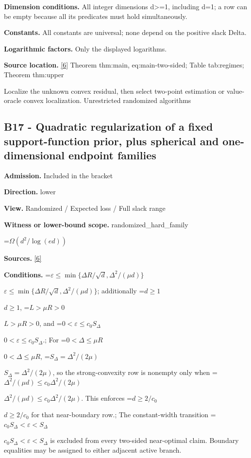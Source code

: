 \documentclass[10pt,a4paper]{article}
\newcommand{\AtlasMath}[1]{\par\begingroup\centering\setbox0=\hbox{$\displaystyle #1$}\ifdim\wd0>1.4\linewidth\typeout{ATLAS WIDE FORMULA: \the\wd0}\fi\ifdim\wd0>\linewidth\resizebox{\linewidth}{!}{\box0}\else\box0\fi\par\endgroup}
\newcommand{\AtlasInlineMath}[1]{\begingroup\setbox0=\hbox{$#1$}\ifdim\wd0>.4\linewidth\endgroup\AtlasMath{#1}\else\endgroup$#1$\fi}
\begin{document}
\textbf{Dimension conditions.} All integer dimensions d>=1, including d=1; a row can be empty because all its predicates must hold simultaneously.



\textbf{Constants.} All constants are universal; none depend on the positive slack Delta.



\textbf{Logarithmic factors.} Only the displayed logarithms.



\textbf{Source location.} \href{https://github.com/WU-Wendao/Colombo/blob/main/colombo_sensorium/Complexity_altas/data/sources/colombo/U10/manuscript.pdf}{[6]} Theorem thm:main, eq:main-two-sided; Table tab:regimes; Theorem thm:upper



Localize the unknown convex residual, then select two-point estimation or value-oracle convex localization. Unrestricted randomized algorithms



\subsection{B17 - Quadratic regularization of a fixed support-function prior, plus spherical and one-dimensional endpoint families}


\textbf{Admission.} Included in the bracket



\textbf{Direction.} lower



\textbf{View.} Randomized / Expected loss / Full slack range



\textbf{Witness or lower-bound scope.} randomized\_hard\_family



\AtlasMath{\Omega(d^2/\log(ed))}


\textbf{Sources.} \href{https://github.com/WU-Wendao/Colombo/blob/main/colombo_sensorium/Complexity_altas/data/sources/colombo/U10/manuscript.pdf}{[6]}



\textbf{Conditions.} \AtlasInlineMath{\varepsilon\le\min\{\Delta R/\sqrt d,\Delta^2/(\mu d)\}}; additionally \AtlasInlineMath{d\ge1}, \AtlasInlineMath{L>\mu R>0}, and \AtlasInlineMath{0<\varepsilon\le c_0S_\Delta}.; For \AtlasInlineMath{0<\Delta\le\mu R}, \AtlasInlineMath{S_\Delta=\Delta^2/(2\mu)}, so the strong-convexity row is nonempty only when \AtlasInlineMath{\Delta^2/(\mu d)\le c_0\Delta^2/(2\mu)}. This enforces \AtlasInlineMath{d\ge2/c_0} for that near-boundary row.; The constant-width transition \AtlasInlineMath{c_0S_\Delta<\varepsilon<S_\Delta} is excluded from every two-sided near-optimal claim. Boundary equalities may be assigned to either adjacent active branch.
\end{document}
